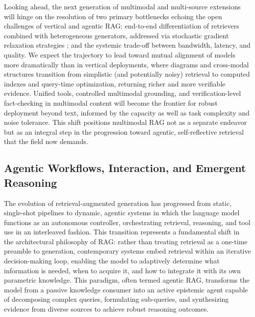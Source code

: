 \documentclass[11pt,a4paper]{article}
\begin{document}
Looking ahead, the next generation of multimodal and multi-source extensions will hinge on the resolution of two primary bottlenecks echoing the open challenges of vertical and agentic RAG: end-to-end differentiation of retrievers combined with heterogeneous generators, addressed via stochastic gradient relaxation strategies \cite{arxiv:2405.02816v1}; and the systemic trade-off between bandwidth, latency, and quality. We expect the trajectory to lead toward mutual alignment of models more dramatically than in vertical deployments, where diagrams and cross-modal structures transition from simplistic (and potentially noisy) retrieval to computed indexes and query-time optimization, returning richer and more verifiable evidence. Unified tools, controlled multimodal grounding, and verification-level fact-checking in multimodal content will become the frontier for robust deployment beyond text, informed by the capacity as well as task complexity and noise tolerance. This shift positions multimodal RAG not as a separate endeavor but as an integral step in the progression toward agentic, self-reflective retrieval that the field now demands.


\subsection{Agentic Workflows, Interaction, and Emergent Reasoning}


The evolution of retrieval-augmented generation has progressed from static, single-shot pipelines to dynamic, agentic systems in which the language model functions as an autonomous controller, orchestrating retrieval, reasoning, and tool use in an interleaved fashion. This transition represents a fundamental shift in the architectural philosophy of RAG: rather than treating retrieval as a one-time preamble to generation, contemporary systems embed retrieval within an iterative decision-making loop, enabling the model to adaptively determine what information is needed, when to acquire it, and how to integrate it with its own parametric knowledge. This paradigm, often termed agentic RAG, transforms the model from a passive knowledge consumer into an active epistemic agent capable of decomposing complex queries, formulating sub-queries, and synthesizing evidence from diverse sources to achieve robust reasoning outcomes.
\end{document}
